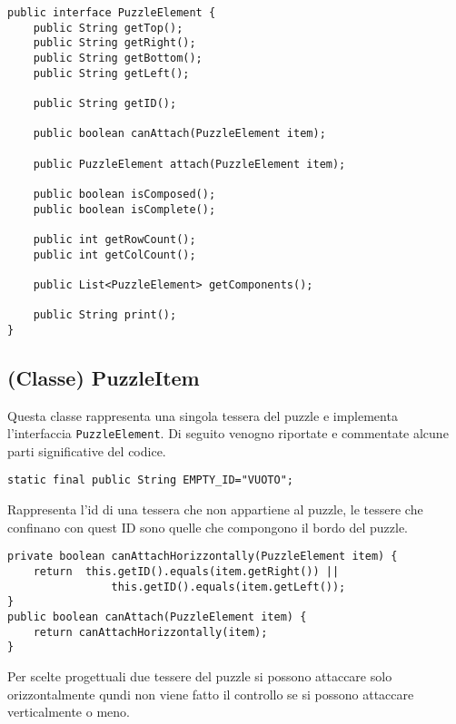 \documentclass[a4paper, 11pt]{article}
\begin{document}
\begin{lstlisting}
public interface PuzzleElement {
    public String getTop();
    public String getRight();
    public String getBottom();
    public String getLeft();

    public String getID();

    public boolean canAttach(PuzzleElement item);

    public PuzzleElement attach(PuzzleElement item);

    public boolean isComposed();
    public boolean isComplete();

    public int getRowCount();
    public int getColCount();

    public List<PuzzleElement> getComponents();

    public String print();
}
\end{lstlisting}

\subsection{(Classe) PuzzleItem}

Questa classe rappresenta una singola tessera del puzzle e implementa l'interfaccia \texttt{PuzzleElement}.
Di seguito venogno riportate e commentate alcune parti significative del codice.

\begin{lstlisting}
static final public String EMPTY_ID="VUOTO";
\end{lstlisting}
Rappresenta l'id di una tessera che non appartiene al puzzle, le tessere che confinano con quest ID sono quelle che compongono il bordo del puzzle.
\begin{lstlisting}
private boolean canAttachHorizzontally(PuzzleElement item) {
	return	this.getID().equals(item.getRight()) ||
				this.getID().equals(item.getLeft());
}
public boolean canAttach(PuzzleElement item) {
	return canAttachHorizzontally(item);
}
\end{lstlisting}
Per scelte progettuali due tessere del puzzle si possono attaccare solo orizzontalmente qundi non viene fatto il controllo se si possono attaccare verticalmente o meno.
\end{document}
